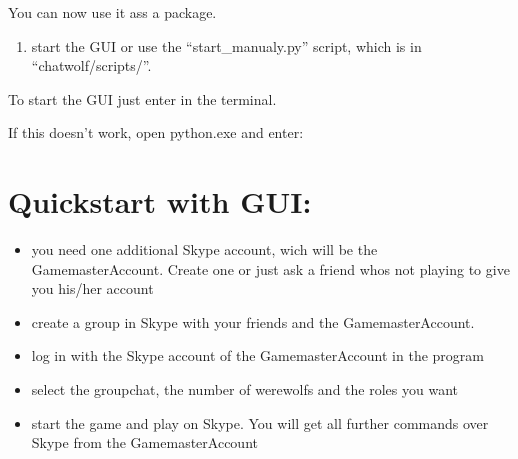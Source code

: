 \documentclass[letterpaper,10pt,english]{sphinxmanual}
\begin{document}
\begin{sphinxVerbatim}[commandchars=\\\{\}]
  
\end{sphinxVerbatim}

You can now use it ass a package.
\begin{enumerate}
%
\item {} 
start the GUI or use the “start\_manualy.py” script, which is in “chatwolf/scripts/”.

\end{enumerate}

To start the GUI just enter  in the terminal.

If this doesn’t work, open python.exe and enter:

\begin{sphinxVerbatim}[commandchars=\\\{\}]
 
  
\end{sphinxVerbatim}


\section{Quickstart with GUI:}
\label{\detokenize{data/Readme:quickstart-with-gui}}\begin{itemize}
\item {} 
you need one additional Skype account, wich will be the Game\sphinxhyphen{}master\sphinxhyphen{}Account.
Create one or just ask a friend whos not playing to give you his/her account

\item {} 
create a group in Skype with your friends and the Game\sphinxhyphen{}master\sphinxhyphen{}Account.

\item {} 
log in with the Skype account of the Game\sphinxhyphen{}master\sphinxhyphen{}Account in the program

\item {} 
select the groupchat, the number of werewolfs and the roles you want

\item {} 
start the game and play on Skype.
You will get all further commands over Skype from the Game\sphinxhyphen{}master\sphinxhyphen{}Account

\end{itemize}
\end{document}

